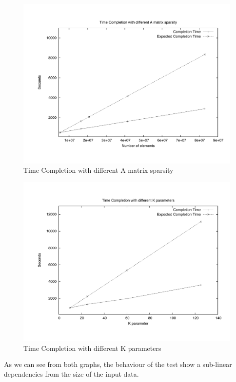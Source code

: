 \begin{figure}[th]
	\centerline{
		\mbox{\includegraphics[scale=0.48]{HadoopTest/PsFiles/DeltaVar.pdf}}
	}
	\caption{Time Completion with different A matrix sparsity} 
        \label{DeltaVar}
\end{figure}

\begin{figure}[th]
	\centerline{
		\mbox{\includegraphics[scale=0.48]{HadoopTest/PsFiles/kVar.pdf}}
	}
	\caption{Time Completion with different K parameters} 
        \label{kVar}
\end{figure}


As we can see from both graphs, the behaviour of the test show a sub-linear dependencies from the size of the input data. \\


